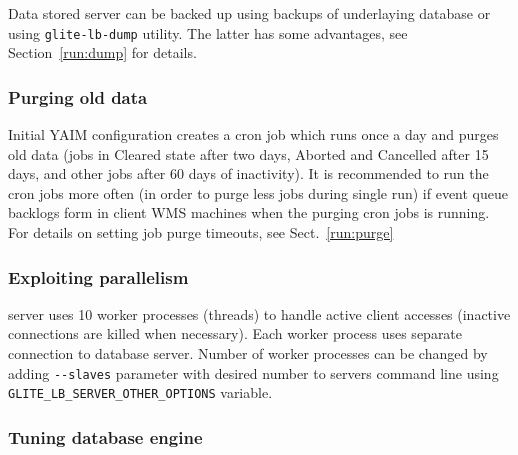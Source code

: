 Data stored \LB server can be backed up using backups of underlaying database or using \verb'glite-lb-dump' utility.
The latter has some advantages, see Section~\ref{run:dump} for details.

\subsubsection{Purging old data}
\label{inst:purge}

Initial YAIM configuration creates a cron job which runs once a day and purges old 
data (jobs in Cleared state after two days, Aborted and Cancelled after 15 days, and other jobs 
after 60 days of inactivity). It is recommended to run the cron jobs more often (in order to purge less jobs
during single run) if event queue backlogs form in client WMS machines when the purging cron jobs is running.
For details on setting job purge timeouts, see Sect.~\ref{run:purge}


\subsubsection{Exploiting parallelism}

\LB server uses 10 worker processes (threads) to handle active client accesses (inactive connections are killed
when necessary). Each worker process uses separate connection to database server. Number of worker processes 
can be changed by adding \verb'--slaves' parameter with desired number to servers command line
using \verb'GLITE_LB_SERVER_OTHER_OPTIONS' variable.

\subsubsection{Tuning database engine}
\label{inst:db_tuning}


